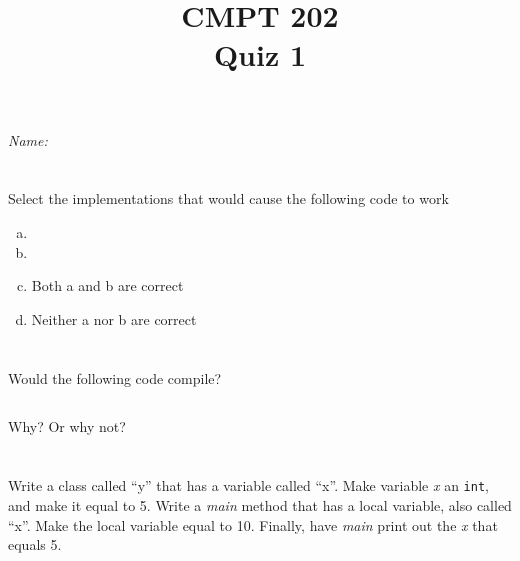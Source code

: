 \documentclass{article}
\title{CMPT 202 \\Quiz 1}
\begin{document}
\maketitle
\emph{Name: }
\section{}
Select the implementations that would cause the following code to work

\begin{enumerate}[a)]
	\item 

	\item 

	\item Both a and b are correct

	\item Neither a nor b are correct
\end{enumerate}
\newpage
\section{}
\subsection{}
Would the following code compile?
\subsection{}

Why? Or why not?
\vspace{1 in}
\section{}

Write a class called ``y'' that has a variable called ``x''. Make variable
\emph{x} an \texttt{int}, and make it equal to 5. Write a \emph{main} method
that has a local variable, also called ``x''. Make the local variable equal to
10. Finally, have \emph{main} print out the \emph{x} that equals 5.
\end{document}
